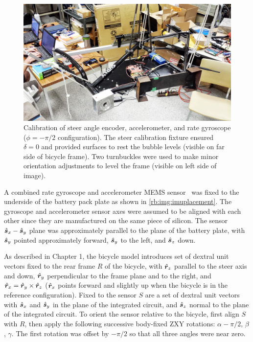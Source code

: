 \begin{figure}[htbp]
  \centering
  \includegraphics[width=\textwidth]{images/20130711_163732_2.jpg}
  \caption[Calibration of steer angle encoder, accelerometer, and rate
    gyroscope.]{Calibration of steer angle encoder, accelerometer, and rate
    gyroscope ($\phi=-\pi/2$ configuration). The steer calibration fixture
    ensured $\delta=0$ and provided surfaces to rest the bubble levels (visible
    on far side of bicycle frame). Two turnbuckles were used to make minor
    orientation adjustments to level the frame (visible on left side of image).}
  \label{rb:img:calibration}
\end{figure}

A combined rate gyroscope and accelerometer MEMS
sensor~\cite{InvensenseMPU6050} was fixed to the underside of the battery pack
plate as shown in \autoref{rb:img:imuplacement}. The gyroscope and
accelerometer sensor axes were assumed to be aligned with each other since they
are manufactured on the same piece of silicon. The sensor $\hat{\boldsymbol{s}}_{x}-\hat{\boldsymbol{s}}_{y}$
plane was approximately parallel to the plane of the battery plate, with
$\hat{\boldsymbol{s}}_{y}$ pointed approximately forward, $\hat{\boldsymbol{s}}_{y}$ to the left, and
$\hat{\boldsymbol{s}}_{z}$ down.

As described in Chapter 1, the bicycle model introduces set of dextral unit
vectors fixed to the rear frame $R$ of the bicycle, with $\hat{\boldsymbol{r}}_{z}$ parallel to
the steer axis and down, $\hat{\boldsymbol{r}}_{y}$ perpendicular to the frame plane and to the
right, and $\hat{\boldsymbol{r}}_{x} = \hat{\boldsymbol{r}}_{y} \times \hat{\boldsymbol{r}}_{z}$ ($\hat{\boldsymbol{r}}_{x}$ points forward and
slightly up when the bicycle is in the reference configuration). Fixed to the sensor $S$
are a set of dextral unit vectors with $\hat{\boldsymbol{s}}_{x}$ and $\hat{\boldsymbol{s}}_{y}$ in the plane
of the integrated circuit, and $\hat{\boldsymbol{s}}_{z}$ normal to the plane of the integrated
circuit. To orient the sensor relative to the bicycle, first align $S$ with
$R$, then apply the following successive body-fixed ZXY rotations: $\alpha -
\pi/2$, $\beta$, $\gamma$. The first rotation was offset by $-\pi/2$ so that
all three angles were near zero.

